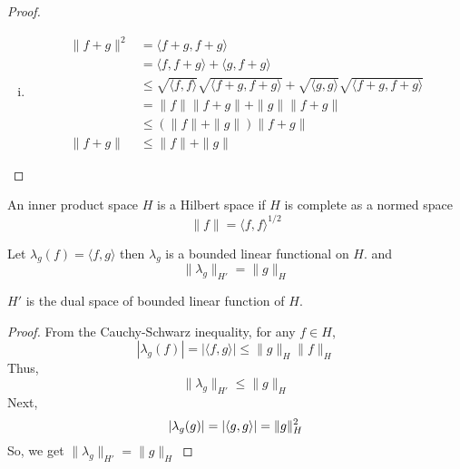 \begin{proof}
\begin{enumerate}[(i)]
    \item \begin{align*}
      \|f+g\|^2 &= \langle f+g, f+g\rangle \\
      &= \langle f, f+g\rangle + \langle g, f+g\rangle \\
      &\le \sqrt{\langle f, f\rangle} \sqrt{\langle f+g, f+g\rangle} + \sqrt{\langle g, g\rangle} \sqrt{\langle f+g, f+g\rangle} \\
      &= \|f\| \|f+g\| + \|g\| \|f+g\| \\
      &\le (\|f\| + \|g\|) \|f+g\| \\
      \|f+g\| &\le \|f\| + \|g\|
    \end{align*}
  \end{enumerate}
\end{proof}

\begin{definition}
  An inner product space $H$ is a Hilbert space if 
  $H$ is complete as a normed space
  \[\|f\| = \langle f, f\rangle^{1/2}\]
\end{definition}

\begin{lemma}
  Let $\lambda_g(f) = \langle f, g\rangle$ then $\lambda_g$ is a bounded linear functional on $H$.
  and 
  \[\|\lambda_g\|_{H'} = \|g\|_H\]
\end{lemma}
\begin{remark}
  $H'$ is the dual space of bounded linear function of $H$.
\end{remark}
\begin{proof}
  From the Cauchy-Schwarz inequality, for any $f \in H$, 
  \[|\lambda_g(f)| = |\langle f,g\rangle| \le \|g\|_H \|f\|_H \]
  Thus,
  \[\|\lambda_g\|_{H'} \le \|g\|_H\]
  Next, 
  \[ |\lambda_g(g)| = |\langle g, g\rangle| = \|g\|_H^2\\ \]
  So, we get $\|\lambda_g\|_{H'} = \|g\|_H$
\end{proof}

